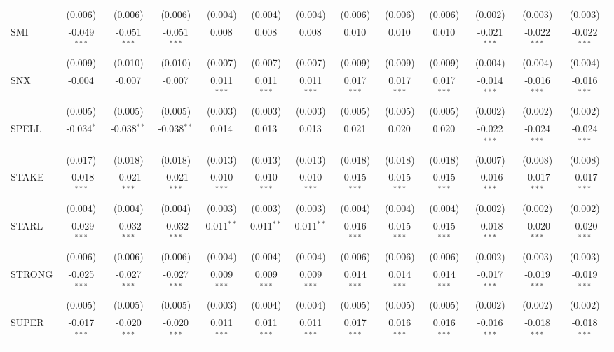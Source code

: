 \begin{table}[!htbp]
\begin{tabular}{@{\extracolsep{5pt}}lcccccccccccc}
  & (0.006) & (0.006) & (0.006) & (0.004) & (0.004) & (0.004) & (0.006) & (0.006) & (0.006) & (0.002) & (0.003) & (0.003) \\
 SMI & -0.049$^{***}$ & -0.051$^{***}$ & -0.051$^{***}$ & 0.008$^{}$ & 0.008$^{}$ & 0.008$^{}$ & 0.010$^{}$ & 0.010$^{}$ & 0.010$^{}$ & -0.021$^{***}$ & -0.022$^{***}$ & -0.022$^{***}$ \\
  & (0.009) & (0.010) & (0.010) & (0.007) & (0.007) & (0.007) & (0.009) & (0.009) & (0.009) & (0.004) & (0.004) & (0.004) \\
 SNX & -0.004$^{}$ & -0.007$^{}$ & -0.007$^{}$ & 0.011$^{***}$ & 0.011$^{***}$ & 0.011$^{***}$ & 0.017$^{***}$ & 0.017$^{***}$ & 0.017$^{***}$ & -0.014$^{***}$ & -0.016$^{***}$ & -0.016$^{***}$ \\
  & (0.005) & (0.005) & (0.005) & (0.003) & (0.003) & (0.003) & (0.005) & (0.005) & (0.005) & (0.002) & (0.002) & (0.002) \\
 SPELL & -0.034$^{*}$ & -0.038$^{**}$ & -0.038$^{**}$ & 0.014$^{}$ & 0.013$^{}$ & 0.013$^{}$ & 0.021$^{}$ & 0.020$^{}$ & 0.020$^{}$ & -0.022$^{***}$ & -0.024$^{***}$ & -0.024$^{***}$ \\
  & (0.017) & (0.018) & (0.018) & (0.013) & (0.013) & (0.013) & (0.018) & (0.018) & (0.018) & (0.007) & (0.008) & (0.008) \\
 STAKE & -0.018$^{***}$ & -0.021$^{***}$ & -0.021$^{***}$ & 0.010$^{***}$ & 0.010$^{***}$ & 0.010$^{***}$ & 0.015$^{***}$ & 0.015$^{***}$ & 0.015$^{***}$ & -0.016$^{***}$ & -0.017$^{***}$ & -0.017$^{***}$ \\
  & (0.004) & (0.004) & (0.004) & (0.003) & (0.003) & (0.003) & (0.004) & (0.004) & (0.004) & (0.002) & (0.002) & (0.002) \\
 STARL & -0.029$^{***}$ & -0.032$^{***}$ & -0.032$^{***}$ & 0.011$^{**}$ & 0.011$^{**}$ & 0.011$^{**}$ & 0.016$^{***}$ & 0.015$^{***}$ & 0.015$^{***}$ & -0.018$^{***}$ & -0.020$^{***}$ & -0.020$^{***}$ \\
  & (0.006) & (0.006) & (0.006) & (0.004) & (0.004) & (0.004) & (0.006) & (0.006) & (0.006) & (0.002) & (0.003) & (0.003) \\
 STRONG & -0.025$^{***}$ & -0.027$^{***}$ & -0.027$^{***}$ & 0.009$^{***}$ & 0.009$^{***}$ & 0.009$^{***}$ & 0.014$^{***}$ & 0.014$^{***}$ & 0.014$^{***}$ & -0.017$^{***}$ & -0.019$^{***}$ & -0.019$^{***}$ \\
  & (0.005) & (0.005) & (0.005) & (0.003) & (0.004) & (0.004) & (0.005) & (0.005) & (0.005) & (0.002) & (0.002) & (0.002) \\
 SUPER & -0.017$^{***}$ & -0.020$^{***}$ & -0.020$^{***}$ & 0.011$^{***}$ & 0.011$^{***}$ & 0.011$^{***}$ & 0.017$^{***}$ & 0.016$^{***}$ & 0.016$^{***}$ & -0.016$^{***}$ & -0.018$^{***}$ & -0.018$^{***}$ \\

\end{tabular}
\end{table}
